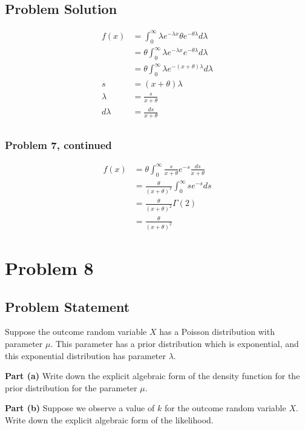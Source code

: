\documentclass[12pt]{article}
\theoremstyle{definition}
\begin{document}
\subsection*{Problem Solution}
\begin{align*}
f(x) &= \int_0^\infty \lambda e^{-\lambda x} \theta e^{-\theta\lambda}d\lambda\\
&= \theta \int_0^\infty \lambda e^{-\lambda x} e^{-\theta\lambda}d\lambda\\
&= \theta \int_0^\infty \lambda e^{-(x + \theta)\lambda}d\lambda\\
s &= (x + \theta)\lambda\\
\lambda &= \frac{s}{x + \theta}\\
d\lambda &= \frac{ds}{x + \theta}\\
\end{align*}

\newpage
\subsubsection*{Problem 7, continued}
\begin{align*}
f(x) &= \theta \int_0^\infty \frac{s}{x + \theta} e^{-s} \frac{ds}{x + \theta}\\
&= \frac{\theta}{(x + \theta)^2} \int_0^\infty se^{-s}ds\\
&= \frac{\theta}{(x + \theta)^2} \Gamma(2)\\
&= \frac{\theta}{(x + \theta)^2}
\end{align*}


\newpage
\section*{Problem 8}

\subsection*{Problem Statement}

Suppose the outcome random variable $X$ has a Poisson distribution with parameter $\mu$. This parameter has a prior distribution which is exponential, and this exponential distribution has parameter $\lambda$.

\bigskip
\noindent
{\bf Part (a)} Write down the explicit algebraic form of the density function for the prior distribution for the parameter $\mu$.

\bigskip
\noindent
{\bf Part (b)} Suppose we observe a value of $k$ for the outcome random variable $X$. Write down the explicit algebraic form of the likelihood.
\end{document}

